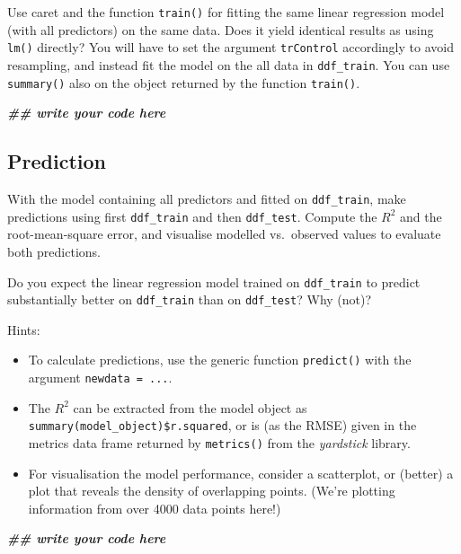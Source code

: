 \documentclass[
]{book}
\newenvironment{Shaded}{\begin{snugshade}}{\end{snugshade}}
\newcommand{\DocumentationTok}[1]{\textcolor[rgb]{0.56,0.35,0.01}{\textbf{\textit{#1}}}}
\providecommand{\tightlist}{%
  \setlength{\itemsep}{0pt}\setlength{\parskip}{0pt}}
\begin{document}
Use caret and the function \texttt{train()} for fitting the same linear regression model (with all predictors) on the same data. Does it yield identical results as using \texttt{lm()} directly? You will have to set the argument \texttt{trControl} accordingly to avoid resampling, and instead fit the model on the all data in \texttt{ddf\_train}. You can use \texttt{summary()} also on the object returned by the function \texttt{train()}.

\begin{Shaded}
\begin{Highlighting}[]
\DocumentationTok{\#\# write your code here}
\end{Highlighting}
\end{Shaded}

\hypertarget{prediction}{%
\subsection{Prediction}\label{prediction}}

With the model containing all predictors and fitted on \texttt{ddf\_train}, make predictions using first \texttt{ddf\_train} and then \texttt{ddf\_test}. Compute the \(R^2\) and the root-mean-square error, and visualise modelled vs.~observed values to evaluate both predictions.

Do you expect the linear regression model trained on \texttt{ddf\_train} to predict substantially better on \texttt{ddf\_train} than on \texttt{ddf\_test}? Why (not)?

Hints:

\begin{itemize}
\tightlist
\item
  To calculate predictions, use the generic function \texttt{predict()} with the argument \texttt{newdata\ =\ ...}.
\item
  The \(R^2\) can be extracted from the model object as \texttt{summary(model\_object)\$r.squared}, or is (as the RMSE) given in the metrics data frame returned by \texttt{metrics()} from the \emph{yardstick} library.
\item
  For visualisation the model performance, consider a scatterplot, or (better) a plot that reveals the density of overlapping points. (We're plotting information from over 4000 data points here!)
\end{itemize}

\begin{Shaded}
\begin{Highlighting}[]
\DocumentationTok{\#\# write your code here}
\end{Highlighting}
\end{Shaded}
\end{document}
